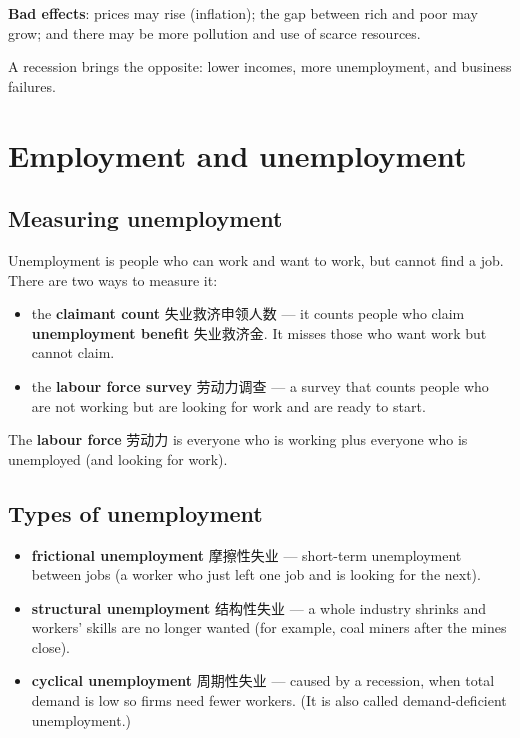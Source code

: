 \documentclass[11pt]{article}
\begin{document}
\textbf{Bad effects}: prices may rise (inflation); the gap between rich and poor may grow; and there may be more pollution and use of scarce resources.

A recession brings the opposite: lower incomes, more unemployment, and business failures.

\section*{Employment and unemployment}

\subsection*{Measuring unemployment}

Unemployment is people who can work and want to work, but cannot find a job. There are two ways to measure it:

\begin{itemize}
\item the \textbf{claimant count} 失业救济申领人数 — it counts people who claim \textbf{unemployment benefit} 失业救济金. It misses those who want work but cannot claim.

\item the \textbf{labour force survey} 劳动力调查 — a survey that counts people who are not working but are looking for work and are ready to start.

\end{itemize}

The \textbf{labour force} 劳动力 is everyone who is working plus everyone who is unemployed (and looking for work).

\subsection*{Types of unemployment}

\begin{itemize}
\item \textbf{frictional unemployment} 摩擦性失业 — short-term unemployment between jobs (a worker who just left one job and is looking for the next).

\item \textbf{structural unemployment} 结构性失业 — a whole industry shrinks and workers' skills are no longer wanted (for example, coal miners after the mines close).

\item \textbf{cyclical unemployment} 周期性失业 — caused by a recession, when total demand is low so firms need fewer workers. (It is also called demand-deficient unemployment.)

\end{itemize}
\end{document}
